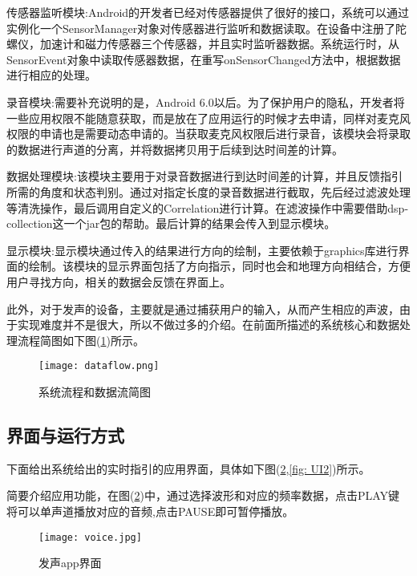 \documentclass[winfonts,oneside]{njuthesis}
\begin{document}
			传感器监听模块:Android的开发者已经对传感器提供了很好的接口，系统可以通过实例化一个SensorManager对象对传感器进行监听和数据读取。在设备中注册了陀螺仪，加速计和磁力传感器三个传感器，并且实时监听器数据。系统运行时，从SensorEvent对象中读取传感器数据，在重写onSensorChanged方法中，根据数据进行相应的处理。
			
			录音模块:需要补充说明的是，Android 6.0以后。为了保护用户的隐私，开发者将一些应用权限不能随意获取，而是放在了应用运行的时候才去申请，同样对麦克风权限的申请也是需要动态申请的。当获取麦克风权限后进行录音，该模块会将录取的数据进行声道的分离，并将数据拷贝用于后续到达时间差的计算。
			
			数据处理模块:该模块主要用于对录音数据进行到达时间差的计算，并且反馈指引所需的角度和状态判别。通过对指定长度的录音数据进行截取，先后经过滤波处理等清洗操作，最后调用自定义的Correlation进行计算。在滤波操作中需要借助dsp-collection这一个jar包的帮助。最后计算的结果会传入到显示模块。
			
			显示模块:显示模块通过传入的结果进行方向的绘制，主要依赖于graphics库进行界面的绘制。该模块的显示界面包括了方向指示，同时也会和地理方向相结合，方便用户寻找方向，相关的数据会反馈在界面上。
			
			此外，对于发声的设备，主要就是通过捕获用户的输入，从而产生相应的声波，由于实现难度并不是很大，所以不做过多的介绍。在前面所描述的系统核心和数据处理流程简图如下图(\ref{fig: dataflow})所示。
			
			\begin{figure}[H]
				\centering
				\texttt{[image: dataflow.png]} 
				\caption{{系统流程和数据流简图}}
				\label{fig: dataflow}
			\end{figure}
			
		\subsection{界面与运行方式}
		
			下面给出系统给出的实时指引的应用界面，具体如下图(\ref{fig: UI1},\ref{fig: UI2})所示。
			
			简要介绍应用功能，在图(\ref{fig: UI1})中，通过选择波形和对应的频率数据，点击PLAY键将可以单声道播放对应的音频,点击PAUSE即可暂停播放。
			
			\begin{figure}[H]
				\centering
				\texttt{[image: voice.jpg]}
				\caption{发声app界面}
				\label{fig: UI1}
			\end{figure}
		
\end{document}

